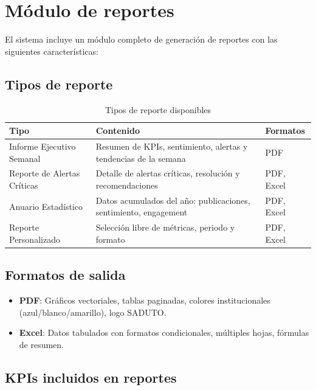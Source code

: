 \documentclass[11pt,a4paper]{article}
\begin{document}
\section{Módulo de reportes}

El sistema incluye un módulo completo de generación de reportes con las siguientes características:

\subsection{Tipos de reporte}

\begin{table}[H]
\centering
\begin{tabularx}{\textwidth}{l X l}
\toprule
\textbf{Tipo} & \textbf{Contenido} & \textbf{Formatos} \\
\midrule
Informe Ejecutivo Semanal & Resumen de KPIs, sentimiento, alertas y tendencias de la semana & PDF \\
\rowcolor{tablerow}
Reporte de Alertas Críticas & Detalle de alertas críticas, resolución y recomendaciones & PDF, Excel \\
Anuario Estadístico & Datos acumulados del año: publicaciones, sentimiento, engagement & PDF, Excel \\
\rowcolor{tablerow}
Reporte Personalizado & Selección libre de métricas, periodo y formato & PDF, Excel \\
\bottomrule
\end{tabularx}
\caption{Tipos de reporte disponibles}
\end{table}

\subsection{Formatos de salida}

\begin{itemize}
  \item \textbf{PDF}: Gráficos vectoriales, tablas paginadas, colores institucionales (azul/blanco/amarillo), logo SADUTO.
  \item \textbf{Excel}: Datos tabulados con formatos condicionales, múltiples hojas, fórmulas de resumen.
\end{itemize}

\subsection{KPIs incluidos en reportes}
\end{document}
